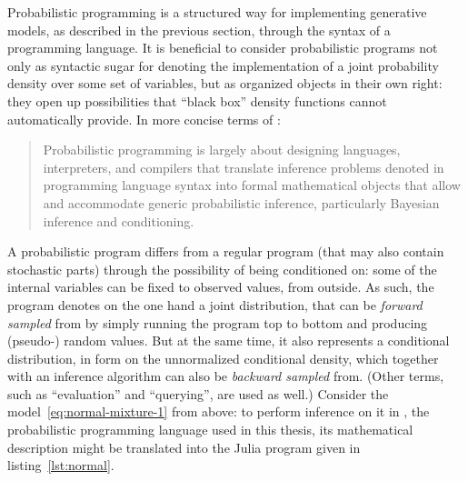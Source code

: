 Probabilistic programming is a structured way for implementing generative models, as described in the
previous section, through the syntax of a programming language.  It is beneficial to consider
probabilistic programs not only as syntactic sugar for denoting the implementation of a joint
probability density over some set of variables, but as organized objects in their own right: they
open up possibilities that \enquote{black box} density functions cannot automatically provide. In
more concise terms of \textcite{vandemeent2018introduction}:
\begin{quote}
  Probabilistic programming is largely about designing languages, interpreters, and compilers that
  translate inference problems denoted in programming language syntax into formal mathematical
  objects that allow and accommodate generic probabilistic inference, particularly Bayesian
  inference and conditioning.
\end{quote}

A probabilistic program differs from a regular program (that may also contain stochastic parts)
through the possibility of being conditioned on: some of the internal variables can be fixed to
observed values, from outside. As such, the program denotes on the one hand a joint distribution,
that can be \emph{forward sampled} from by simply running the program top to bottom and producing
(pseudo-) random values.  But at the same time, it also represents a conditional distribution, in
form on the unnormalized conditional density, which together with an inference algorithm can also be
\emph{backward sampled} from.  (Other terms, such as \enquote{evaluation} and \enquote{querying},
are used as well.)  Consider the model~\eqref{eq:normal-mixture-1} from above: to perform inference
on it in \turingjl{} \parencite{ge2018turing}, the probabilistic programming language used in this
thesis, its mathematical description might be translated into the Julia program given in
listing~\ref{lst:normal}.

